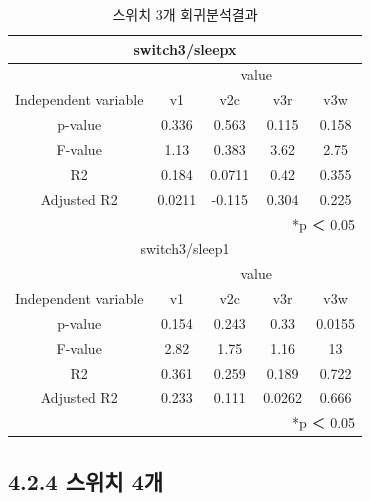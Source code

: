 \documentclass[11pt
  , a4paper
  , article
  , oneside
]{memoir}
\begin{document}
\begin{table}[h!]
\begin{center}
\begin{tabular}{c|c||c||c||c}\hline
\multicolumn{5}{c}{switch3/sleepx}\\ \hline\hline
\multicolumn{1}{c|}{}& \multicolumn{4}{c}{value}\\
\cline{1-5}
Independent variable & v1 & v2c & v3r & v3w      \\ \hline\hline
p-value & 0.336 & 0.563 & 0.115 & 0.158\\ 
F-value & 1.13  & 0.383 & 3.62 & 2.75\\ 
R2 & 0.184 & 0.0711 & 0.42 & 0.355\\ 
Adjusted R2 & 0.0211 & -0.115 & 0.304 & 0.225\\ \hline\hline
\multicolumn{5}{r}{*p ＜ 0.05} \\ \hline \hline
\multicolumn{5}{c}{switch3/sleep1}\\ \hline\hline
\multicolumn{1}{c|}{}& \multicolumn{4}{c}{value}\\
\cline{1-5}
Independent variable & v1 & v2c & v3r & v3w      \\ \hline\hline
p-value & 0.154 & 0.243 & 0.33 & 0.0155\\ 
F-value & 2.82 & 1.75 & 1.16 & 13\\ 
R2 & 0.361 & 0.259 & 0.189 & 0.722\\ 
Adjusted R2 & 0.233  & 0.111& 0.0262 & 0.666\\ \hline

\multicolumn{5}{r}{*p ＜ 0.05} \\ \hline\hline
\end{tabular}
\caption{  스위치 3개 회귀분석결과 }
\end{center}
\end{table} 

\clearpage
\subsection{4.2.4 스위치 4개}
\end{document}
